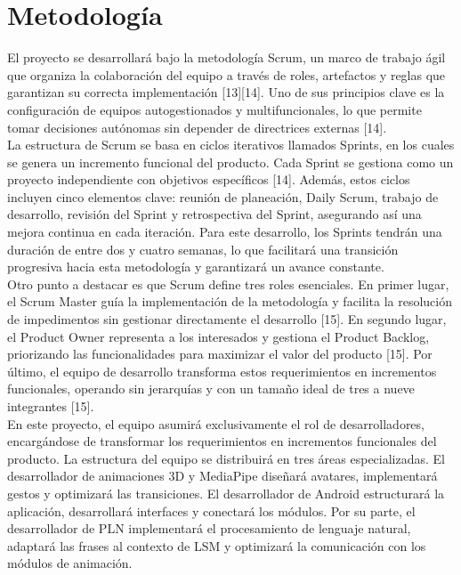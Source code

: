 \newpage
\section{Metodología}
El proyecto se desarrollará bajo la metodología Scrum, un marco de trabajo ágil que organiza la colaboración del equipo a través de roles, artefactos y reglas que garantizan su correcta implementación [13][14]. Uno de sus principios clave es la configuración de equipos autogestionados y multifuncionales, lo que permite tomar decisiones autónomas sin depender de directrices externas [14].\\

La estructura de Scrum se basa en ciclos iterativos llamados Sprints, en los cuales se genera un incremento funcional del producto. Cada Sprint se gestiona como un proyecto independiente con objetivos específicos [14]. Además, estos ciclos incluyen cinco elementos clave: reunión de planeación, Daily Scrum, trabajo de desarrollo, revisión del Sprint y retrospectiva del Sprint, asegurando así una mejora continua en cada iteración. Para este desarrollo, los Sprints tendrán una duración de entre dos y cuatro semanas, lo que facilitará una transición progresiva hacia esta metodología y garantizará un avance constante.\\

Otro punto a destacar es que Scrum define tres roles esenciales. En primer lugar, el Scrum Master guía la implementación de la metodología y facilita la resolución de impedimentos sin gestionar directamente el desarrollo [15]. En segundo lugar, el Product Owner representa a los interesados y gestiona el Product Backlog, priorizando las funcionalidades para maximizar el valor del producto [15]. Por último, el equipo de desarrollo transforma estos requerimientos en incrementos funcionales, operando sin jerarquías y con un tamaño ideal de tres a nueve integrantes [15].\\

En este proyecto, el equipo asumirá exclusivamente el rol de desarrolladores, encargándose de transformar los requerimientos en incrementos funcionales del producto. La estructura del equipo se distribuirá en tres áreas especializadas. El desarrollador de animaciones 3D y MediaPipe diseñará avatares, implementará gestos y optimizará las transiciones. El desarrollador de Android estructurará la aplicación, desarrollará interfaces y conectará los módulos. Por su parte, el desarrollador de PLN implementará el procesamiento de lenguaje natural, adaptará las frases al contexto de LSM y optimizará la comunicación con los módulos de animación.\\

